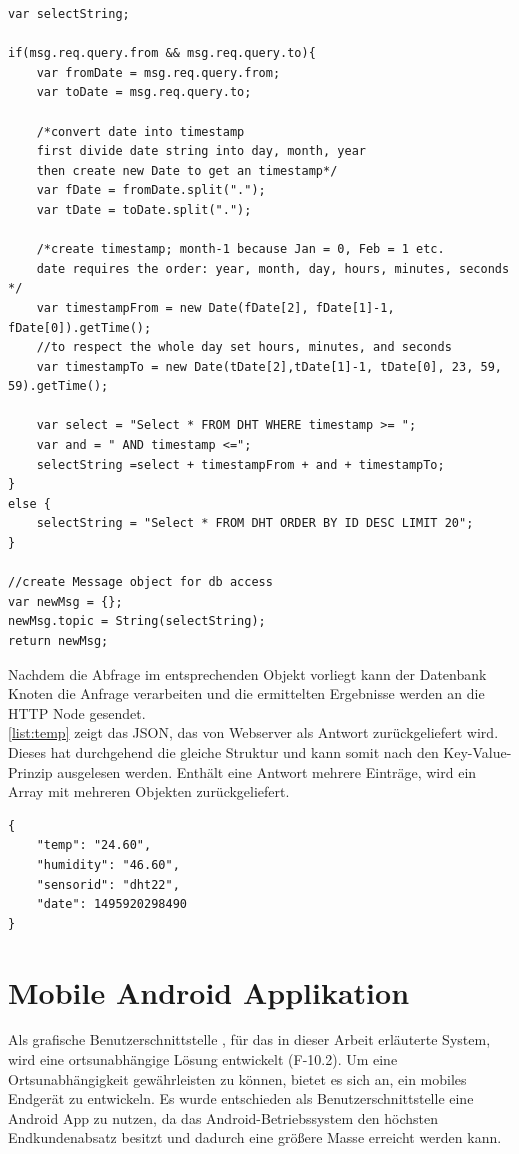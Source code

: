 \begin{lstlisting}[label=list:tempInt, caption={Funktion Node-RED tempInt}]
var selectString;

if(msg.req.query.from && msg.req.query.to){
	var fromDate = msg.req.query.from;
	var toDate = msg.req.query.to;
	
	/*convert date into timestamp
	first divide date string into day, month, year 
	then create new Date to get an timestamp*/
	var fDate = fromDate.split("."); 
	var tDate = toDate.split(".");
	
	/*create timestamp; month-1 because Jan = 0, Feb = 1 etc.
	date requires the order: year, month, day, hours, minutes, seconds */
	var timestampFrom = new Date(fDate[2], fDate[1]-1, fDate[0]).getTime();
	//to respect the whole day set hours, minutes, and seconds
	var timestampTo = new Date(tDate[2],tDate[1]-1, tDate[0], 23, 59, 59).getTime();
	
	var select = "Select * FROM DHT WHERE timestamp >= "; 
	var and = " AND timestamp <=";
	selectString =select + timestampFrom + and + timestampTo;
}
else {
	selectString = "Select * FROM DHT ORDER BY ID DESC LIMIT 20";
}

//create Message object for db access
var newMsg = {};
newMsg.topic = String(selectString);
return newMsg;
\end{lstlisting}

Nachdem die Abfrage im entsprechenden Objekt vorliegt kann der Datenbank Knoten die Anfrage verarbeiten und die ermittelten Ergebnisse werden an die \ac{HTTP} Node gesendet.
\\\autoref{list:temp}  zeigt das \ac{JSON}, das von Webserver als Antwort zurückgeliefert wird. Dieses hat durchgehend die gleiche Struktur und kann somit nach den Key-Value-Prinzip ausgelesen werden. Enthält eine Antwort mehrere Einträge, wird ein Array mit mehreren Objekten zurückgeliefert.
\begin{lstlisting}[label=list:temp, caption={JSON Response /temp}]
{
	"temp": "24.60",
	"humidity": "46.60",
	"sensorid": "dht22",
	"date": 1495920298490
}
\end{lstlisting}

\section{Mobile Android Applikation}
Als grafische Benutzerschnittstelle , für das in dieser Arbeit erläuterte System, wird eine ortsunabhängige Lösung entwickelt (F-10.2). Um eine Ortsunabhängigkeit gewährleisten zu können, bietet es sich an, ein mobiles Endgerät zu entwickeln. Es wurde  entschieden als Benutzerschnittstelle eine Android App zu nutzen, da das Android-Betriebssystem den höchsten Endkundenabsatz besitzt \cite{statista:marktanteileandroid} und dadurch eine größere Masse erreicht werden kann.

